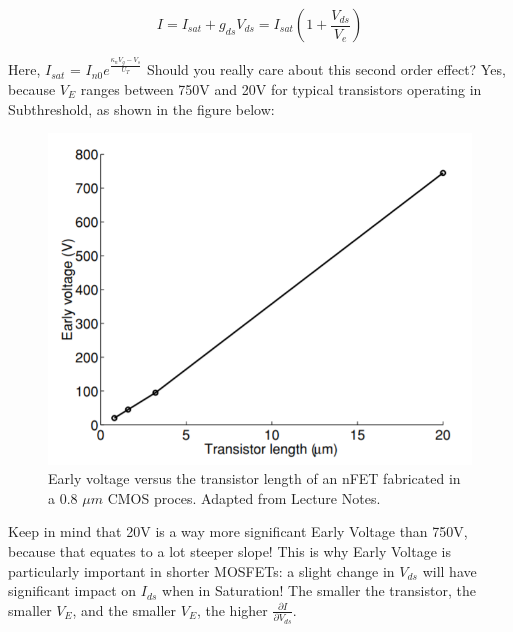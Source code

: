 \begin{equation}
    I = I_{sat} + g_{ds}V_{ds} = I_{sat}(1 + \frac{V_{ds}}{V_e})
\end{equation}

Here, $I_{sat}$ =  $I_{n0} e^{\frac{\kappa_{n}V_g - V_s}{U_T}}$
Should you really care about this second order effect? Yes, because $V_E$ ranges between 750V and 20V for typical transistors operating in Subthreshold, as shown in the figure below: 

\begin{figure}[H]
    \centering
    \includegraphics[width=0.95\linewidth]{../../Figures/Early_Voltage_Vs_MOSFET_Length.PNG}
    \caption{Early voltage versus the transistor length of an nFET fabricated in a 0.8 $\mu m$ CMOS proces. Adapted from Lecture Notes.}
    \label{fig:basalandcerebellum}
\end{figure}

Keep in mind that 20V is a way more significant Early Voltage than 750V, because that equates to a lot steeper slope! This is why Early Voltage is particularly important in shorter MOSFETs: a slight change in $V_{ds}$ will have significant impact on $I_{ds}$ when in Saturation! The smaller the transistor, the smaller $V_E$, and the smaller $V_E$, the higher $\frac{\partial I}{\partial V_{ds}}$. 
